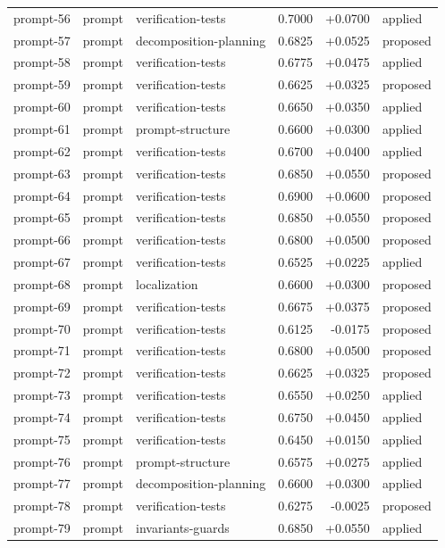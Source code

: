 \begin{center}
\begin{longtable}{llp{5.2cm}rrl}
prompt-56 & prompt & verification-tests & 0.7000 & +0.0700 & applied \\
prompt-57 & prompt & decomposition-planning & 0.6825 & +0.0525 & proposed \\
prompt-58 & prompt & verification-tests & 0.6775 & +0.0475 & applied \\
prompt-59 & prompt & verification-tests & 0.6625 & +0.0325 & proposed \\
prompt-60 & prompt & verification-tests & 0.6650 & +0.0350 & applied \\
prompt-61 & prompt & prompt-structure & 0.6600 & +0.0300 & applied \\
prompt-62 & prompt & verification-tests & 0.6700 & +0.0400 & applied \\
prompt-63 & prompt & verification-tests & 0.6850 & +0.0550 & proposed \\
prompt-64 & prompt & verification-tests & 0.6900 & +0.0600 & proposed \\
prompt-65 & prompt & verification-tests & 0.6850 & +0.0550 & proposed \\
prompt-66 & prompt & verification-tests & 0.6800 & +0.0500 & proposed \\
prompt-67 & prompt & verification-tests & 0.6525 & +0.0225 & applied \\
prompt-68 & prompt & localization & 0.6600 & +0.0300 & proposed \\
prompt-69 & prompt & verification-tests & 0.6675 & +0.0375 & proposed \\
prompt-70 & prompt & verification-tests & 0.6125 & -0.0175 & proposed \\
prompt-71 & prompt & verification-tests & 0.6800 & +0.0500 & proposed \\
prompt-72 & prompt & verification-tests & 0.6625 & +0.0325 & proposed \\
prompt-73 & prompt & verification-tests & 0.6550 & +0.0250 & applied \\
prompt-74 & prompt & verification-tests & 0.6750 & +0.0450 & applied \\
prompt-75 & prompt & verification-tests & 0.6450 & +0.0150 & applied \\
prompt-76 & prompt & prompt-structure & 0.6575 & +0.0275 & applied \\
prompt-77 & prompt & decomposition-planning & 0.6600 & +0.0300 & applied \\
prompt-78 & prompt & verification-tests & 0.6275 & -0.0025 & proposed \\
prompt-79 & prompt & invariants-guards & 0.6850 & +0.0550 & applied \\

\end{longtable}
\end{center}

